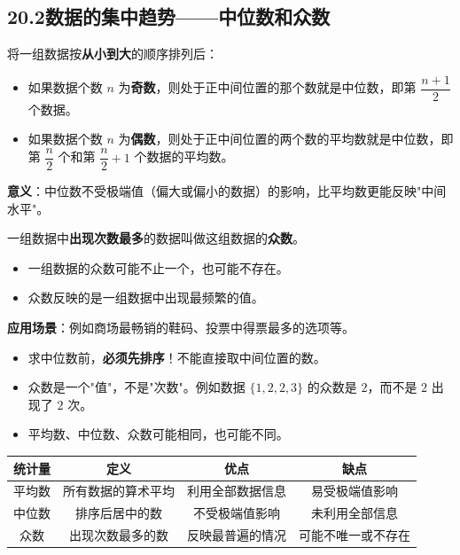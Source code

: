 \documentclass[12pt, a4paper]{ctexart}
\begin{document}
\subsection*{20.2\quad 数据的集中趋势——中位数和众数}

\begin{knowledgebox}[中位数]
将一组数据按\textbf{从小到大}的顺序排列后：

\begin{itemize}[leftmargin=2em]
  \item 如果数据个数 $n$ 为\textbf{奇数}，则处于正中间位置的那个数就是中位数，即第 $\dfrac{n+1}{2}$ 个数据。
  \item 如果数据个数 $n$ 为\textbf{偶数}，则处于正中间位置的两个数的平均数就是中位数，即第 $\dfrac{n}{2}$ 个和第 $\dfrac{n}{2}+1$ 个数据的平均数。
\end{itemize}

\textbf{意义}：中位数不受极端值（偏大或偏小的数据）的影响，比平均数更能反映"中间水平"。
\end{knowledgebox}

\begin{knowledgebox}[众数]
一组数据中\textbf{出现次数最多}的数据叫做这组数据的\textbf{众数}。

\begin{itemize}[leftmargin=2em]
  \item 一组数据的众数可能不止一个，也可能不存在。
  \item 众数反映的是一组数据中出现最频繁的值。
\end{itemize}

\textbf{应用场景}：例如商场最畅销的鞋码、投票中得票最多的选项等。
\end{knowledgebox}

\begin{warnbox}[易错提醒]
\begin{itemize}[leftmargin=2em]
  \item 求中位数前，\textbf{必须先排序}！不能直接取中间位置的数。
  \item 众数是一个"值"，不是"次数"。例如数据 $\{1,2,2,3\}$ 的众数是 $2$，而不是 $2$ 出现了 $2$ 次。
  \item 平均数、中位数、众数可能相同，也可能不同。
\end{itemize}
\end{warnbox}

\begin{knowledgebox}

\begin{center}
\renewcommand{\arraystretch}{1.5}
\begin{tabular}{|c|c|c|c|}
\hline
\textbf{统计量} & \textbf{定义} & \textbf{优点} & \textbf{缺点} \\
\hline
平均数 & 所有数据的算术平均 & 利用全部数据信息 & 易受极端值影响 \\
\hline
中位数 & 排序后居中的数 & 不受极端值影响 & 未利用全部信息 \\
\hline
众数 & 出现次数最多的数 & 反映最普遍的情况 & 可能不唯一或不存在 \\
\hline
\end{tabular}
\end{center}
\end{knowledgebox}
\end{document}

